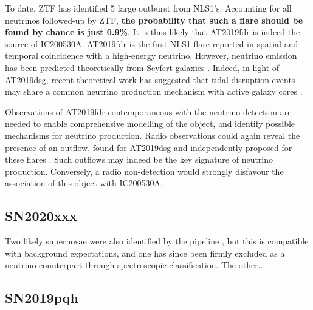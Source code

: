 To date, ZTF has identified 5 large outburst from NLS1's. Accounting for all neutrinos followed-up by ZTF, \textbf{the probability that such a flare should be found by chance is just 0.9\%}. It is thus likely that AT2019fdr is indeed the source of IC200530A. AT2019fdr is the first NLS1 flare reported in spatial and temporal coincidence with a high-energy neutrino. However, neutrino emission has been predicted theoretically from Seyfert galaxies \cite[see e.g]{murase_agn}. Indeed, in light of AT2019dsg, recent theoretical work has suggested that tidal disruption events may share a common neutrino production mechanism with active galaxy cores . 

Observations of AT2019fdr contemporaneous with the neutrino detection are needed to enable comprehensive modelling of the object, and identify possible mechanisms for neutrino production. Radio observations could again reveal the presence of an outflow, found for AT2019dsg and independently proposed for these flares \cite{trakhtenbrot19}. Such outflows may indeed be the key signature of neutrino production. Conversely, a radio non-detection would strongly disfavour the association of this object with IC200530A.
%
\subsection{SN2020xxx}

Two likely supernovae were also identified by the pipeline \cite{ic200530a_ztf}, but this is compatible with background expectations, and one has since been firmly excluded as a neutrino counterpart through spectroscopic classification. The other...

\subsection{SN2019pqh}
\label{sec:sn2019pqh}

